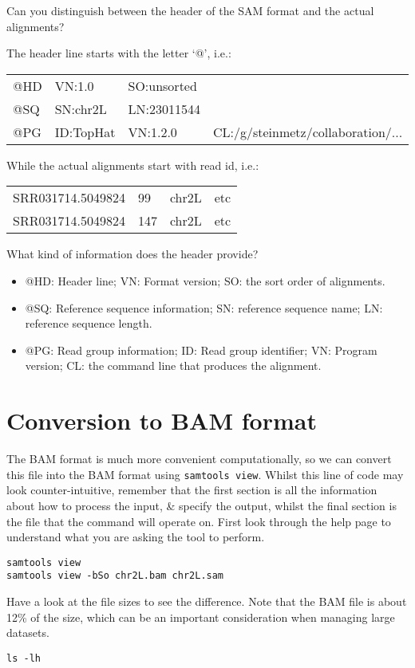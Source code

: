 \begin{questions}
Can you distinguish between the header of the SAM format and the actual alignments?
\begin{answer}
The header line starts with the letter `@', i.e.: \\
\begin{tabular}{llll}
@HD & VN:1.0 & SO:unsorted & \\
@SQ & SN:chr2L & LN:23011544 & \\
@PG & ID:TopHat	& VN:1.2.0 & CL:/g/steinmetz/collaboration/... \\
\end{tabular}

While the actual alignments start with read id, i.e.: \\

\begin{tabular}{llll}
SRR031714.5049824 & 99 & chr2L & etc \\
SRR031714.5049824 & 147 & chr2L & etc \\
\end{tabular}

\end{answer}
What kind of information does the header provide? \\
\begin{answer}
\begin{itemize}
\item @HD: Header line; VN: Format version; SO: the sort order of alignments.
\item @SQ: Reference sequence information; SN: reference sequence name; LN: reference sequence length.
\item @PG: Read group information; ID: Read group identifier; VN: Program version; CL: the command line that produces the alignment.
\end{itemize}
\end{answer}
\end{questions}

\section{Conversion to BAM format}
\begin{steps}
The BAM format is much more convenient computationally, so we can convert this file into the BAM format using \texttt{samtools view}.
Whilst this line of code may look counter-intuitive, remember that the first section is all the information about how to process the input, \& specify the output, whilst the final section is the file that the command will operate on.
First look through the help page to understand what you are asking the tool to perform. \\
\begin{lstlisting}
samtools view 
samtools view -bSo chr2L.bam chr2L.sam
\end{lstlisting}
Have a look at the file sizes to see the difference.
Note that the BAM file is about 12\% of the size, which can be an important consideration when managing large datasets.
\begin{lstlisting}
ls -lh
\end{lstlisting}
\end{steps}

